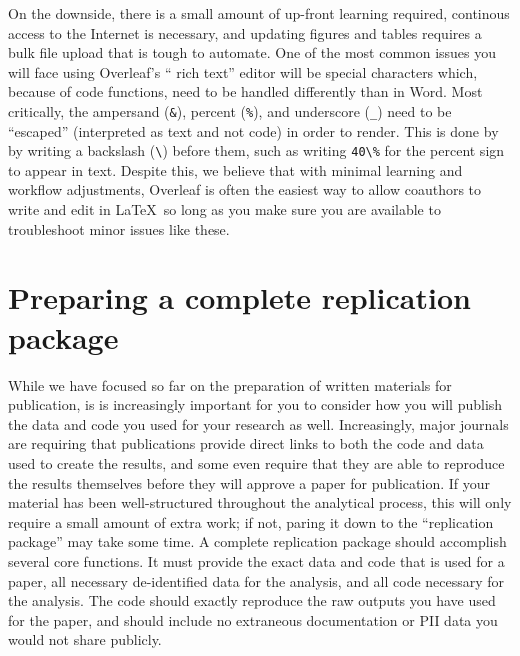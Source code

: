 On the downside, there is a small amount of up-front learning required,
continous access to the Internet is necessary,
and updating figures and tables requires a bulk file upload that is tough to automate.
One of the most common issues you will face using Overleaf's `` rich text'' editor will be special characters
which, because of code functions, need to be handled differently than in Word.
Most critically, the ampersand (\texttt{\&}), percent (\texttt{\%}), and underscore (\texttt{\_})
need to be ``escaped'' (interpreted as text and not code) in order to render.
This is done by by writing a backslash (\texttt{\textbackslash}) before them,
such as writing \texttt{40\textbackslash\%} for the percent sign to appear in text.
Despite this, we believe that with minimal learning and workflow adjustments,
Overleaf is often the easiest way to allow coauthors to write and edit in \LaTeX\,
so long as you make sure you are available to troubleshoot minor issues like these.


\section{Preparing a complete replication package}

While we have focused so far on the preparation of written materials for publication,
is is increasingly important for you to consider how you will publish
the data and code you used for your research as well.
Increasingly, major journals are requiring that publications
provide direct links to both the code and data used to create the results,
and some even require that they are able to reproduce the results themselves
before they will approve a paper for publication.
If your material has been well-structured throughout the analytical process,
this will only require a small amount of extra work;
if not, paring it down to the ``replication package'' may take some time.
A complete replication package should accomplish several core functions.
It must provide the exact data and code that is used for a paper,
all necessary de-identified data for the analysis,
and all code necessary for the analysis.
The code should exactly reproduce the raw outputs you have used for the paper,
and should include no extraneous documentation or PII data you would not share publicly.

